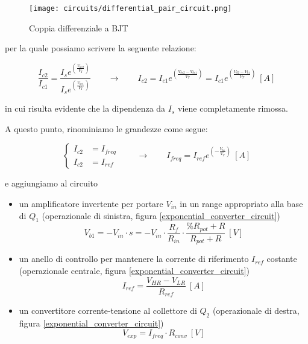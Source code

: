 \begin{figure}[H]
    \centering
    \texttt{[image: circuits/differential\_pair\_circuit.png]}
    \caption{Coppia differenziale a BJT}
    \label{differential_pair_circuit}
\end{figure}

per la quale possiamo scrivere la seguente relazione:

\begin{displaymath}
    \frac{I_{c2}}{I_{c1}}=\frac{I_s e^{\left(\frac{V_{be2}}{V_T}\right)}}{I_s e^{\left(\frac{V_{be1}}{V_T}\right)}}
    \qquad
    \rightarrow
    \qquad
    I_{c2}=I_{c1}e^{\left(\frac{V_{be2}-V_{be1}}{V_T}\right)}=I_{c1}e^{\left(\frac{V_{b2}-V_{b1}}{V_T}\right)}\ [A]
\end{displaymath}

in cui risulta evidente che la dipendenza da $I_s$ viene completamente rimossa.

A questo punto, rinominiamo le grandezze come segue:

\begin{equation*}
    \left\{ \begin{aligned}
        I_{c2} & = I_{freq} \\
        I_{c2} & = I_{ref}
    \end{aligned} \right.
    \qquad
    \rightarrow
    \qquad
    I_{freq}=I_{ref}e^{\left(-\frac{V_{b1}}{V_T}\right)}\ [A]
\end{equation*}

e aggiungiamo al circuito

\begin{itemize}
    \item un amplificatore invertente per portare $V_{in}$ in un range appropriato alla base
          di $Q_1$ (operazionale di sinistra, figura \ref{exponential_converter_circuit})
          \begin{displaymath}
              V_{b1}=-V_{in}\cdot s=
              -V_{in}\cdot\frac{R_f}{R_{in}}\cdot\frac{\%R_{pot}+R}{R_{pot}+R}\ [V]
          \end{displaymath}
    \item un anello di controllo per mantenere la corrente di riferimento $I_{ref}$ costante
          (operazionale centrale, figura \ref{exponential_converter_circuit})
          \begin{displaymath}
              I_{ref}=\frac{V_{HR}-V_{LR}}{R_{ref}}\ [A]
          \end{displaymath}
    \item un convertitore corrente-tensione al collettore di $Q_2$ (operazionale di destra,
          figura \ref{exponential_converter_circuit})
          \begin{displaymath}
              V_{exp}=I_{freq}\cdot R_{conv}\ [V]
          \end{displaymath}
\end{itemize}

